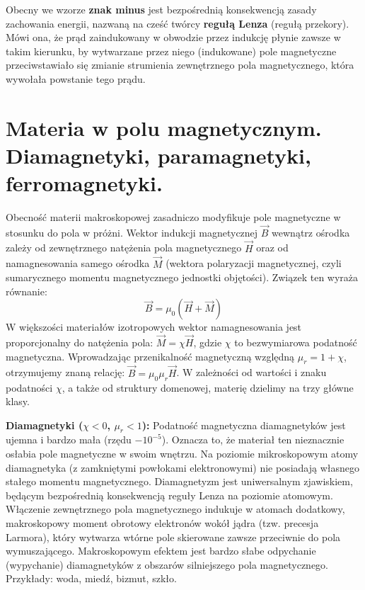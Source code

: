 \documentclass[11pt, a4paper]{article}
\begin{document}
Obecny we wzorze \textbf{znak minus} jest bezpośrednią konsekwencją zasady zachowania energii, nazwaną na cześć twórcy \textbf{regułą Lenza} (regułą przekory). Mówi ona, że prąd zaindukowany w obwodzie przez indukcję płynie zawsze w takim kierunku, by wytwarzane przez niego (indukowane) pole magnetyczne przeciwstawiało się zmianie strumienia zewnętrznego pola magnetycznego, która wywołała powstanie tego prądu.

\section{Materia w polu magnetycznym. Diamagnetyki, paramagnetyki, ferromagnetyki.}

Obecność materii makroskopowej zasadniczo modyfikuje pole magnetyczne w stosunku do pola w próżni. Wektor indukcji magnetycznej $\vec{B}$ wewnątrz ośrodka zależy od zewnętrznego natężenia pola magnetycznego $\vec{H}$ oraz od namagnesowania samego ośrodka $\vec{M}$ (wektora polaryzacji magnetycznej, czyli sumarycznego momentu magnetycznego jednostki objętości). Związek ten wyraża równanie:
\[
\vec{B} = \mu_0 (\vec{H} + \vec{M})
\]
W większości materiałów izotropowych wektor namagnesowania jest proporcjonalny do natężenia pola: $\vec{M} = \chi \vec{H}$, gdzie $\chi$ to bezwymiarowa podatność magnetyczna. Wprowadzając przenikalność magnetyczną względną $\mu_r = 1 + \chi$, otrzymujemy znaną relację: $\vec{B} = \mu_0 \mu_r \vec{H}$. W zależności od wartości i znaku podatności $\chi$, a także od struktury domenowej, materię dzielimy na trzy główne klasy.

\textbf{Diamagnetyki ($\chi < 0$, $\mu_r < 1$):}
Podatność magnetyczna diamagnetyków jest ujemna i bardzo mała (rzędu $-10^{-5}$). Oznacza to, że materiał ten nieznacznie osłabia pole magnetyczne w swoim wnętrzu. Na poziomie mikroskopowym atomy diamagnetyka (z zamkniętymi powłokami elektronowymi) nie posiadają własnego stałego momentu magnetycznego. Diamagnetyzm jest uniwersalnym zjawiskiem, będącym bezpośrednią konsekwencją reguły Lenza na poziomie atomowym. Włączenie zewnętrznego pola magnetycznego indukuje w atomach dodatkowy, makroskopowy moment obrotowy elektronów wokół jądra (tzw. precesja Larmora), który wytwarza wtórne pole skierowane zawsze przeciwnie do pola wymuszającego. Makroskopowym efektem jest bardzo słabe odpychanie (wypychanie) diamagnetyków z obszarów silniejszego pola magnetycznego. Przykłady: woda, miedź, bizmut, szkło.
\end{document}
